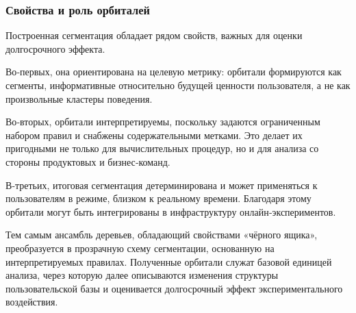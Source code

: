 \subsubsection{Свойства и роль орбиталей}
\label{subsubsec:orbital_properties}

Построенная сегментация обладает рядом свойств, важных для оценки
долгосрочного эффекта.

Во‑первых, она ориентирована на целевую метрику: орбитали формируются
как сегменты, информативные относительно будущей ценности пользователя,
а не как произвольные кластеры поведения.

Во‑вторых, орбитали интерпретируемы, поскольку задаются ограниченным
набором правил и снабжены содержательными метками. Это делает их
пригодными не только для вычислительных процедур, но и для анализа
со стороны продуктовых и бизнес‑команд.

В‑третьих, итоговая сегментация детерминирована и может применяться
к пользователям в режиме, близком к реальному времени.
Благодаря этому орбитали могут быть интегрированы в инфраструктуру
онлайн‑экспериментов.

Тем самым ансамбль деревьев, обладающий свойствами «чёрного ящика»,
преобразуется в прозрачную схему сегментации, основанную на
интерпретируемых правилах. Полученные орбитали служат базовой
единицей анализа, через которую далее описываются изменения
структуры пользовательской базы и оценивается долгосрочный эффект
экспериментального воздействия.
